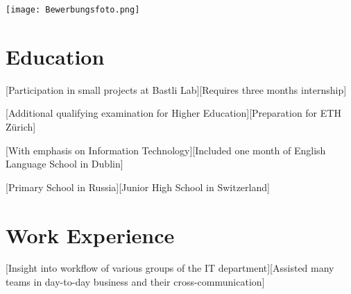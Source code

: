 \documentclass[11pt,ngerman]{IgorFrangezCV}
\begin{document}

\parbox{\textwidth}{
	\begin{minipage}{0.4\textwidth} 
	\vspace{0.3cm}
	\end{minipage}
	\hfill
	\begin{minipage}{0.7\textwidth}
	\flushright
	\texttt{[image: Bewerbungsfoto.png]}
	\hspace{1.5cm} %
	\label{Bild} 
	\end{minipage}
}


\section{Education}
[Participation in small projects at Bastli Lab][Requires three months internship]

[Additional qualifying examination for Higher Education][Preparation for ETH Z\"urich]

[With emphasis on Information Technology][Included one month of English Language School in Dublin]

[Primary School in Russia][Junior High School in Switzerland] 


\section{Work Experience}
[Insight into workflow of various groups of the IT department][Assisted many teams in day-to-day business and their cross-communication]
\end{document}
